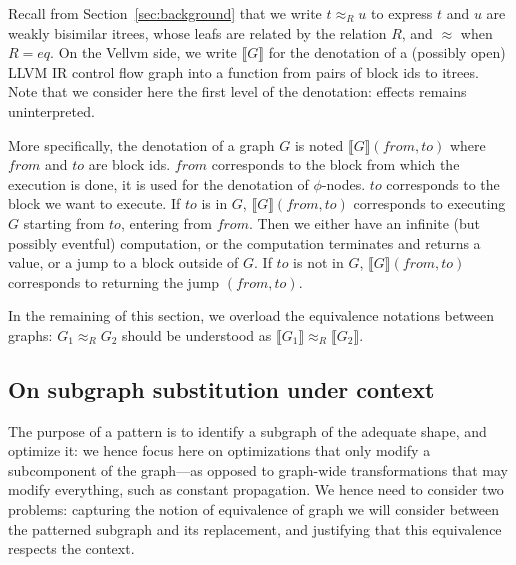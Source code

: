 \documentclass[11pt]{article}
\newcommand{\yz}[1]{\textcolor{ForestGreen}{#1}}
\begin{document}
Recall from Section~\ref{sec:background} that we write $t \approx_R u$ to express $t$ and $u$ are weakly bisimilar itrees, whose leafs are related by the relation $R$, and $\approx$ when $R=eq$. On the Vellvm side, we write $\llbracket G \rrbracket$ for the denotation of a (possibly open) LLVM IR control flow graph into a function from pairs of block ids to itrees. Note that we consider here the first level of the denotation: effects remains uninterpreted.

More specifically, the denotation of a graph $G$ is noted $\llbracket G \rrbracket (from, to)$ where $from$ and $to$ are block ids. $from$ corresponds to the block from which the execution is done, it is used for the denotation of $\phi$-nodes. $to$ corresponds to the block we want to execute. If $to$ is in $G$, $\llbracket G \rrbracket (from, to)$ corresponds to executing $G$ starting from $to$, entering from $from$. Then we either have an infinite (but possibly eventful) computation, or the computation terminates and returns a value, or a jump to a block outside of $G$. If $to$ is not in $G$, $\llbracket G \rrbracket (from, to)$ corresponds to returning the jump $(from, to)$.

In the remaining of this section, we overload the equivalence notations between graphs: $G_1 \approx_R G_2$ should be understood as $\llbracket G_1\rrbracket \approx_R \llbracket G_2\rrbracket$.

\subsection{On subgraph substitution under context}

The purpose of a pattern is to identify a subgraph of the adequate shape, and optimize it: we hence focus here on optimizations that only modify a subcomponent of the graph---as opposed to graph-wide transformations that may modify everything, such as constant propagation. We hence need to consider two problems: capturing the notion of equivalence of graph we will consider between the patterned subgraph and its replacement, and justifying that this equivalence respects the context.



\end{document}
